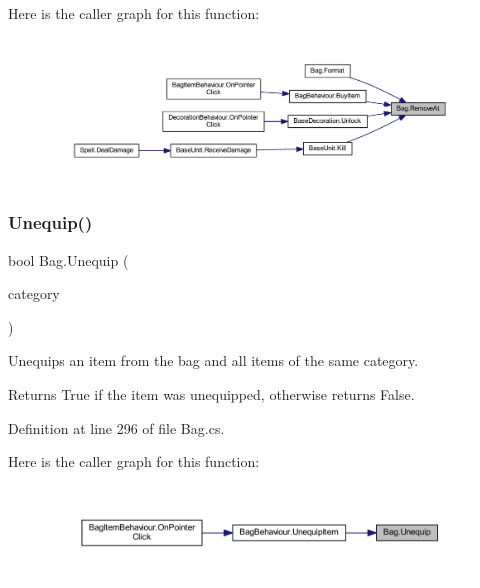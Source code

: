 Here is the caller graph for this function\+:
\nopagebreak
\begin{figure}[H]
\begin{center}
\leavevmode
\includegraphics[width=350pt]{class_bag_a2f11a414bf3edfd7f380f30b71f34104_icgraph}
\end{center}
\end{figure}
\mbox{\label{class_bag_aacb4579a06f66e1578327635e2120b3e}} 
\subsubsection{\texorpdfstring{Unequip()}{Unequip()}}
{\footnotesize\ttfamily bool Bag.\+Unequip (\begin{DoxyParamCaption}\item[{\mbox{\hyperlink{class_base_item_a882a2962396f880c2e23755437245d37}{Base\+Item.\+Category}}}]{category }\end{DoxyParamCaption})}



Unequips an item from the bag and all items of the same category. 

\begin{DoxyReturn}{Returns}
True if the item was unequipped, otherwise returns False.
\end{DoxyReturn}


Definition at line 296 of file Bag.\+cs.

Here is the caller graph for this function\+:
\nopagebreak
\begin{figure}[H]
\begin{center}
\leavevmode
\includegraphics[width=350pt]{class_bag_aacb4579a06f66e1578327635e2120b3e_icgraph}
\end{center}
\end{figure}


